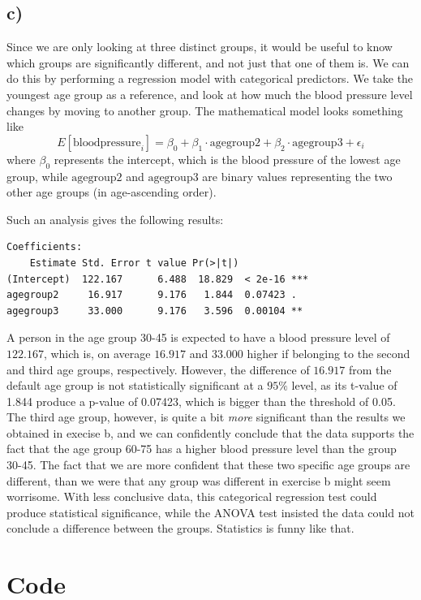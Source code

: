 \documentclass[a4paper, twocolumn]{article}
\begin{document}
\subsection*{c)}
Since we are only looking at three distinct groups, it would be useful to know which groups are significantly different, and not just that one of them is. We can do this by performing a regression model with categorical predictors. We take the youngest age group as a reference, and look at how much the blood pressure level changes by moving to another group. The mathematical model looks something like
\begin{equation}
    E[\mathrm{blood pressure}_i] = \beta_0 + \beta_1\cdot\mathrm{agegroup2} + \beta_2\cdot\mathrm{agegroup3} + \epsilon_i
\end{equation}
where $\beta_0$ represents the intercept, which is the blood pressure of the lowest age group, while $\mathrm{agegroup2}$ and $\mathrm{agegroup3}$ are binary values representing the two other age groups (in age-ascending order).

Such an analysis gives the following results:
\begin{Verbatim}[fontsize=\small]
    Coefficients:
    Estimate Std. Error t value Pr(>|t|)    
(Intercept)  122.167      6.488  18.829  < 2e-16 ***
agegroup2     16.917      9.176   1.844  0.07423 .  
agegroup3     33.000      9.176   3.596  0.00104 ** 
\end{Verbatim}
A person in the age group 30-45 is expected to have a blood pressure level of $122.167$, which is, on average $16.917$ and $33.000$ higher if belonging to the second and third age groups, respectively. However, the difference of $16.917$ from the default age group is not statistically significant at a $95\%$ level, as its t-value of 1.844 produce a p-value of 0.07423, which is bigger than the threshold of 0.05. The third age group, however, is quite a bit \textit{more} significant than the results we obtained in execise b, and we can confidently conclude that the data supports the fact that the age group 60-75 has a higher blood pressure level than the group 30-45. The fact that we are more confident that these two specific age groups are different, than we were that any group was different in exercise b might seem worrisome. With less conclusive data, this categorical regression test could produce statistical significance, while the ANOVA test insisted the data could not conclude a difference between the groups. Statistics is funny like that.

\clearpage
\section*{Code}
\end{document}
